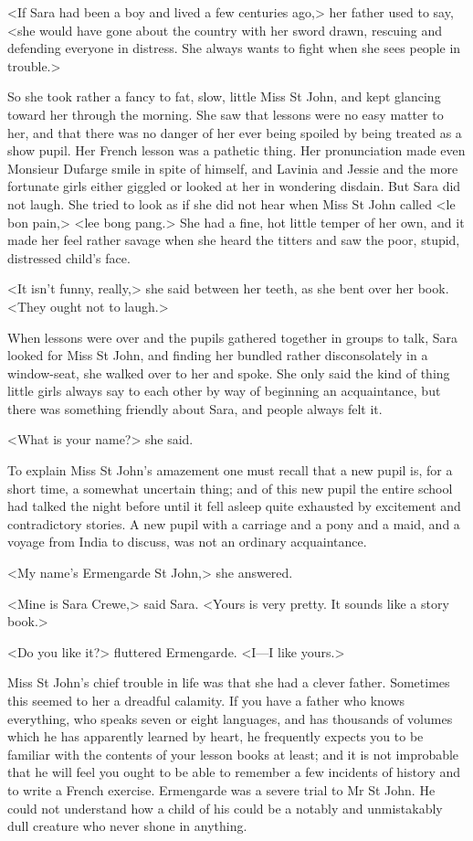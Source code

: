 <If Sara had been a boy and lived a few centuries ago,> her father used to say, <she would have gone about the country with her sword drawn, rescuing and defending everyone in distress. She always wants to fight when she sees people in trouble.>

So she took rather a fancy to fat, slow, little Miss St John, and kept glancing toward her through the morning. She saw that lessons were no easy matter to her, and that there was no danger of her ever being spoiled by being treated as a show pupil. Her French lesson was a pathetic thing. Her pronunciation made even Monsieur Dufarge smile in spite of himself, and Lavinia and Jessie and the more fortunate girls either giggled or looked at her in wondering disdain. But Sara did not laugh. She tried to look as if she did not hear when Miss St John called <le bon pain,> <lee bong pang.> She had a fine, hot little temper of her own, and it made her feel rather savage when she heard the titters and saw the poor, stupid, distressed child's face.

<It isn't funny, really,> she said between her teeth, as she bent over her book. <They ought not to laugh.>

When lessons were over and the pupils gathered together in groups to talk, Sara looked for Miss St John, and finding her bundled rather disconsolately in a window-seat, she walked over to her and spoke. She only said the kind of thing little girls always say to each other by way of beginning an acquaintance, but there was something friendly about Sara, and people always felt it.

<What is your name?> she said.

To explain Miss St John's amazement one must recall that a new pupil is, for a short time, a somewhat uncertain thing; and of this new pupil the entire school had talked the night before until it fell asleep quite exhausted by excitement and contradictory stories. A new pupil with a carriage and a pony and a maid, and a voyage from India to discuss, was not an ordinary acquaintance.

<My name's Ermengarde St John,> she answered.

<Mine is Sara Crewe,> said Sara. <Yours is very pretty. It sounds like a story book.>

<Do you like it?> fluttered Ermengarde. <I—I like yours.>

Miss St John's chief trouble in life was that she had a clever father. Sometimes this seemed to her a dreadful calamity. If you have a father who knows everything, who speaks seven or eight languages, and has thousands of volumes which he has apparently learned by heart, he frequently expects you to be familiar with the contents of your lesson books at least; and it is not improbable that he will feel you ought to be able to remember a few incidents of history and to write a French exercise. Ermengarde was a severe trial to Mr St John. He could not understand how a child of his could be a notably and unmistakably dull creature who never shone in anything.

